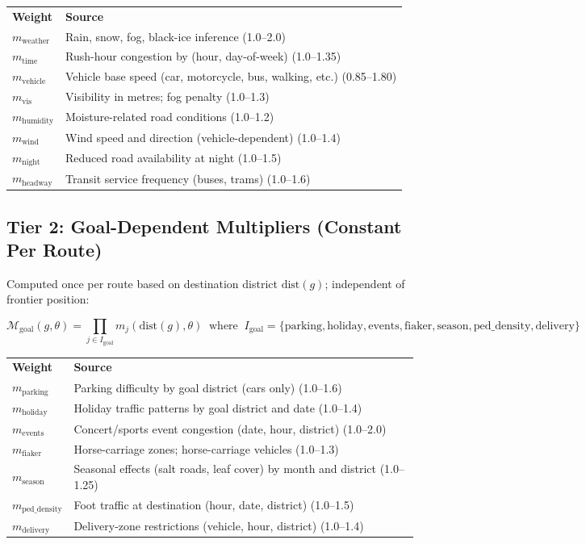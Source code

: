 \documentclass[12pt,a4paper]{article}
\newcommand{\M}{\mathcal{M}}
\begin{document}
\begin{center}
\begin{tabular}{ll}
\textbf{Weight} & \textbf{Source} \\
$m_{\text{weather}}$ & Rain, snow, fog, black-ice inference (1.0–2.0) \\
$m_{\text{time}}$ & Rush-hour congestion by (hour, day-of-week) (1.0–1.35) \\
$m_{\text{vehicle}}$ & Vehicle base speed (car, motorcycle, bus, walking, etc.) (0.85–1.80) \\
$m_{\text{vis}}$ & Visibility in metres; fog penalty (1.0–1.3) \\
$m_{\text{humidity}}$ & Moisture-related road conditions (1.0–1.2) \\
$m_{\text{wind}}$ & Wind speed and direction (vehicle-dependent) (1.0–1.4) \\
$m_{\text{night}}$ & Reduced road availability at night (1.0–1.5) \\
$m_{\text{headway}}$ & Transit service frequency (buses, trams) (1.0–1.6) \\
\end{tabular}
\end{center}

\subsection*{Tier 2: Goal-Dependent Multipliers (Constant Per Route)}

Computed once per route based on destination district $\text{dist}(g)$; independent of frontier position:

\[
\M_{\text{goal}}(g, \theta) = \prod_{j \in I_{\text{goal}}} m_j(\text{dist}(g), \theta) \;\; \text{where} \;\; I_{\text{goal}} = \{\text{parking}, \text{holiday}, \text{events}, \text{fiaker}, \text{season}, \text{ped\_density}, \text{delivery}\}
\]

\begin{center}
\begin{tabular}{ll}
\textbf{Weight} & \textbf{Source} \\
$m_{\text{parking}}$ & Parking difficulty by goal district (cars only) (1.0–1.6) \\
$m_{\text{holiday}}$ & Holiday traffic patterns by goal district and date (1.0–1.4) \\
$m_{\text{events}}$ & Concert/sports event congestion (date, hour, district) (1.0–2.0) \\
$m_{\text{fiaker}}$ & Horse-carriage zones; horse-carriage vehicles (1.0–1.3) \\
$m_{\text{season}}$ & Seasonal effects (salt roads, leaf cover) by month and district (1.0–1.25) \\
$m_{\text{ped\_density}}$ & Foot traffic at destination (hour, date, district) (1.0–1.5) \\
$m_{\text{delivery}}$ & Delivery-zone restrictions (vehicle, hour, district) (1.0–1.4) \\
\end{tabular}
\end{center}
\end{document}
